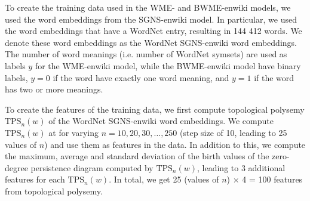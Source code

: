 To create the training data used in the WME- and BWME-enwiki models, we used the word embeddings from the SGNS-enwiki model. In particular, we used the word embeddings that have a WordNet entry, resulting in 144 412 words. We denote these word embeddings as the WordNet SGNS-enwiki word embeddings. The number of word meanings (i.e. number of WordNet symsets) are used as labels $y$ for the WME-enwiki model, while the BWME-enwiki model have binary labels, $y=0$ if the word have exactly one word meaning, and $y=1$ if the word has two or more meanings.

To create the features of the training data, we first compute topological polysemy $\text{TPS}_n(w)$ of the WordNet SGNS-enwiki word embeddings. We compute $\text{TPS}_n(w)$ at for varying $n=10, 20, 30, \ldots, 250$ (step size of 10, leading to 25 values of $n$) and use them as features in the data. In addition to this, we compute the maximum, average and standard deviation of the birth values of the zero-degree persistence diagram computed by $\text{TPS}_n(w)$, leading to 3 additional features for each $\text{TPS}_n(w)$. In total, we get 25 (values of $n$) $\times$ 4 = 100 features from topological polysemy.

